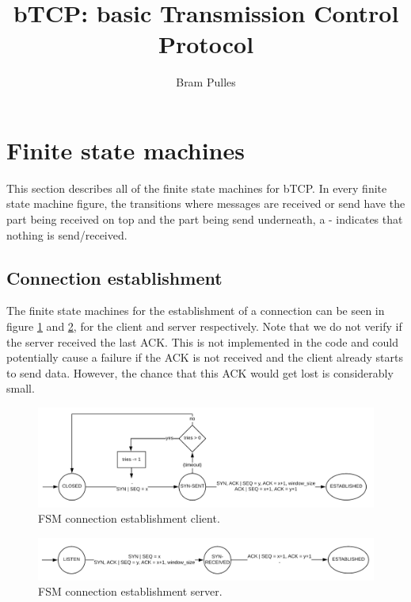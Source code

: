 \documentclass[a4paper]{article}
\author{Bram Pulles}
\title{\textbf{bTCP: basic Transmission Control Protocol}}
\begin{document}
\maketitle

\tableofcontents
\pagebreak

\section{Finite state machines}
This section describes all of the finite state machines for bTCP. In every finite state machine figure, the transitions where messages are received or send have the part being received on top and the part being send underneath, a - indicates that nothing is send/received.

	\subsection{Connection establishment}
	The finite state machines for the establishment of a connection can be seen in figure \ref{fig: phase 1 client} and \ref{fig: phase 1 server}, for the client and server respectively. Note that we do not verify if the server received the last ACK. This is not implemented in the code and could potentially cause a failure if the ACK is not received and the client already starts to send data. However, the chance that this ACK would get lost is considerably small.
	\begin{figure}[h]
		\centering
		\includegraphics[width = \textwidth]{phase1_client.png}
		\caption{FSM connection establishment client.}
		\label{fig: phase 1 client}
	\end{figure}
	\begin{figure}[h]
		\centering
		\includegraphics[width = \textwidth]{phase1_server.png}
		\caption{FSM connection establishment server.}
		\label{fig: phase 1 server}
	\end{figure}
\end{document}
